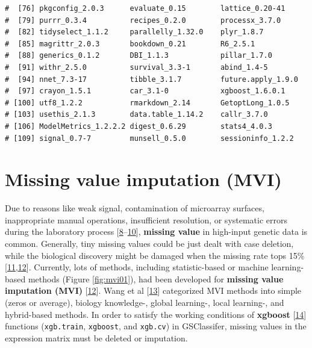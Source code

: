 \documentclass[
  12pt,
]{book}
\newcommand{\passthrough}[1]{#1}
\begin{document}
\begin{lstlisting}
#  [76] pkgconfig_2.0.3      evaluate_0.15        lattice_0.20-41     
#  [79] purrr_0.3.4          recipes_0.2.0        processx_3.7.0      
#  [82] tidyselect_1.1.2     parallelly_1.32.0    plyr_1.8.7          
#  [85] magrittr_2.0.3       bookdown_0.21        R6_2.5.1            
#  [88] generics_0.1.2       DBI_1.1.3            pillar_1.7.0        
#  [91] withr_2.5.0          survival_3.3-1       abind_1.4-5         
#  [94] nnet_7.3-17          tibble_3.1.7         future.apply_1.9.0  
#  [97] crayon_1.5.1         car_3.1-0            xgboost_1.6.0.1     
# [100] utf8_1.2.2           rmarkdown_2.14       GetoptLong_1.0.5    
# [103] usethis_2.1.3        data.table_1.14.2    callr_3.7.0         
# [106] ModelMetrics_1.2.2.2 digest_0.6.29        stats4_4.0.3        
# [109] signal_0.7-7         munsell_0.5.0        sessioninfo_1.2.2
\end{lstlisting}

\hypertarget{missing-value-imputation-mvi}{%
\section{Missing value imputation (MVI)}\label{missing-value-imputation-mvi}}

Due to reasons like weak signal, contamination of microarray surfaces, inappropriate manual operations, insufficient resolution, or systematic errors during the laboratory process {[}\protect\hyperlink{ref-RN387}{8}--\protect\hyperlink{ref-RN382}{10}{]}, \textbf{missing value} in high-input genetic data is common. Generally, tiny missing values could be just dealt with case deletion, while the biological discovery might be damaged when the missing rate tops 15\% {[}\protect\hyperlink{ref-RN392}{11},\protect\hyperlink{ref-RN386}{12}{]}. Currently, lots of methods, including statistic-based or machine learning-based methods (Figure \ref{fig:mvi01}), had been developed for \textbf{missing value imputation (MVI)} {[}\protect\hyperlink{ref-RN386}{12}{]}. Wang et al {[}\protect\hyperlink{ref-RN384}{13}{]} categorized MVI methods into simple (zeros or average), biology knowledge-, global learning-, local learning-, and hybrid-based methods. In order to satisfy the working conditions of \textbf{xgboost} {[}\protect\hyperlink{ref-xgboost}{14}{]} functions (\passthrough{\lstinline!xgb.train!}, \passthrough{\lstinline!xgboost!}, and \passthrough{\lstinline!xgb.cv!}) in GSClassifer, missing values in the expression matrix must be deleted or imputation.
\end{document}
